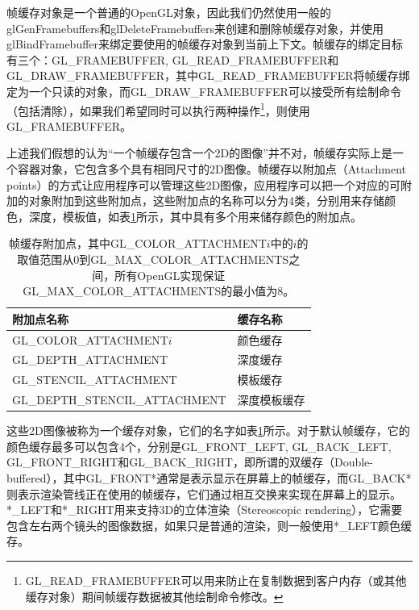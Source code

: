 帧缓存对象是一个普通的OpenGL对象，因此我们仍然使用一般的glGenFramebuffers和glDeleteFramebuffers来创建和删除帧缓存对象，并使用glBindFramebuffer来绑定要使用的帧缓存对象到当前上下文。帧缓存的绑定目标有三个：GL\_FRAMEBUFFER, GL\_READ\_FRAMEBUFFER和GL\_DRAW\_FRAMEBUFFER，其中GL\_READ\_FRAMEBUFFER将帧缓存绑定为一个只读的对象，而GL\_DRAW\_FRAMEBUFFER可以接受所有绘制命令（包括清除），如果我们希望同时可以执行两种操作\footnote{GL\_READ\_FRAMEBUFFER可以用来防止在复制数据到客户内存（或其他缓存对象）期间帧缓存数据被其他绘制命令修改。}，则使用GL\_FRAMEBUFFER。

上述我们假想的认为“一个帧缓存包含一个2D的图像”并不对，帧缓存实际上是一个容器对象，它包含多个具有相同尺寸的2D图像。帧缓存以附加点（Attachment points）的方式让应用程序可以管理这些2D图像，应用程序可以把一个对应的可附加的对象附加到这些附加点，这些附加点的名称可以分为4类，分别用来存储颜色，深度，模板值，如表\ref{t:api-attachment-points}所示，其中具有多个用来储存颜色的附加点。

\begin{table}
\caption{帧缓存附加点，其中GL\_COLOR\_ATTACHMENT$i$中的$i$的取值范围从0到GL\_MAX\_COLOR\_ATTACHMENTS之间，所有OpenGL实现保证GL\_MAX\_COLOR\_ATTACHMENTS的最小值为8。}
\label{t:api-attachment-points}
\centering
\begin{tabular}{>{\small}p{}|>{\small}p{}}
\hline 
   附加点名称 & 缓存名称\\
    \hline  
    GL\_COLOR\_ATTACHMENT$i$       &颜色缓存\\
    GL\_DEPTH\_ATTACHMENT          &深度缓存\\
    GL\_STENCIL\_ATTACHMENT        &模板缓存\\
    GL\_DEPTH\_STENCIL\_ATTACHMENT &深度模板缓存\\

 \hline 
\end{tabular}
\end{table}

这些2D图像被称为一个缓存对象，它们的名字如表\ref{t:api-attachment-points}所示。对于默认帧缓存，它的颜色缓存最多可以包含4个，分别是GL\_FRONT\_LEFT, GL\_BACK\_LEFT, GL\_FRONT\_RIGHT和GL\_BACK\_RIGHT，即所谓的双缓存（Double-buffered），其中GL\_FRONT*通常是表示显示在屏幕上的帧缓存，而GL\_BACK*则表示渲染管线正在使用的帧缓存，它们通过相互交换来实现在屏幕上的显示。*\_LEFT和*\_RIGHT用来支持3D的立体渲染（Stereoscopic rendering），它需要包含左右两个镜头的图像数据，如果只是普通的渲染，则一般使用*\_LEFT颜色缓存。

